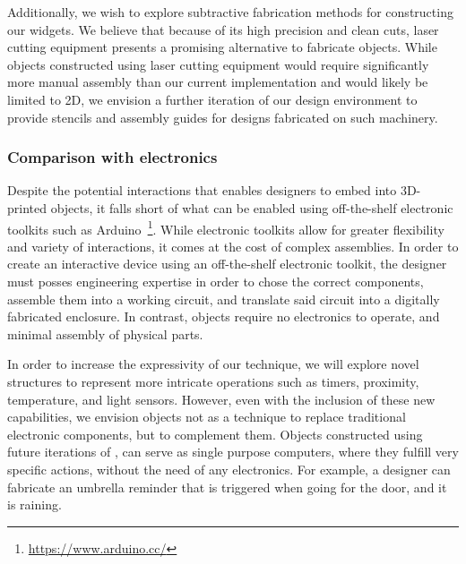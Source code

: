         Additionally, we wish to explore subtractive fabrication methods for
        constructing our widgets. We believe that because of its high precision
        and clean cuts, laser cutting equipment presents a promising alternative
        to fabricate \al objects. While \al objects constructed using laser
        cutting equipment would require significantly more manual assembly than
        our current implementation and would likely be limited to 2D, we
        envision a further iteration of our design environment to provide
        stencils and assembly guides for \al designs fabricated on such
        machinery.
        
      \subsubsection{Comparison with electronics}
        Despite the potential interactions that \al enables designers to
        embed into 3D-printed objects, it falls short of what can be
        enabled using off-the-shelf electronic toolkits such as
        Arduino~\footnote{\url{https://www.arduino.cc/}}. While electronic
        toolkits allow for greater flexibility and variety of interactions,
        it comes at the cost of complex assemblies. In order to create an
        interactive device using an off-the-shelf electronic toolkit, the
        designer must posses engineering expertise in order to chose the
        correct components, assemble them into a working circuit, and
        translate said circuit into a digitally fabricated enclosure. In
        contrast, \al objects require no electronics to operate, and
        minimal assembly of physical parts.
        
        In order to increase the expressivity of our technique, we will
        explore novel structures to represent more intricate operations
        such as timers, proximity, temperature, and light sensors. However,
        even with the inclusion of these new capabilities, we envision \al
        objects not as a technique to replace traditional electronic
        components, but to complement them. Objects constructed using
        future iterations of \al, can serve as single purpose computers,
        where they fulfill very specific actions, without the need of any
        electronics. For example, a designer can fabricate an umbrella
        reminder that is triggered when going for the door, and it is
        raining.

